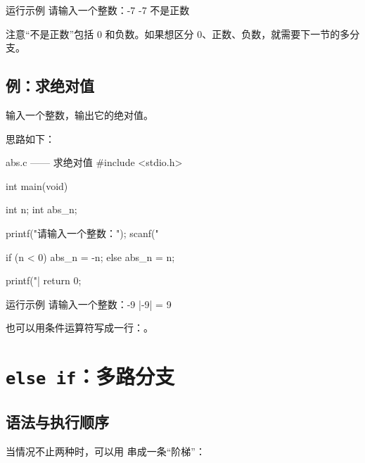 \begin{outbox}{运行示例}
请输入一个整数：-7
-7 不是正数
\end{outbox}

注意“不是正数”包括 0 和负数。如果想区分 0、正数、负数，就需要下一节的多分支。

\subsection{例：求绝对值}

\begin{example}
输入一个整数，输出它的绝对值。
\end{example}
\begin{solution}
思路如下：

\begin{codebox}{abs.c —— 求绝对值}
#include <stdio.h>

int main(void)
{
    int n;
    int abs_n;

    printf("请输入一个整数：");
    scanf("%

    if (n < 0) {
        abs_n = -n;
    } else {
        abs_n = n;
    }

    printf("|%
    return 0;
}
\end{codebox}

\begin{outbox}{运行示例}
请输入一个整数：-9
|-9| = 9
\end{outbox}

也可以用条件运算符写成一行：。
\end{solution}

\section{\texttt{else if}：多路分支}

\subsection{语法与执行顺序}

当情况不止两种时，可以用  串成一条“阶梯”：

\begin{center}
\end{center}

